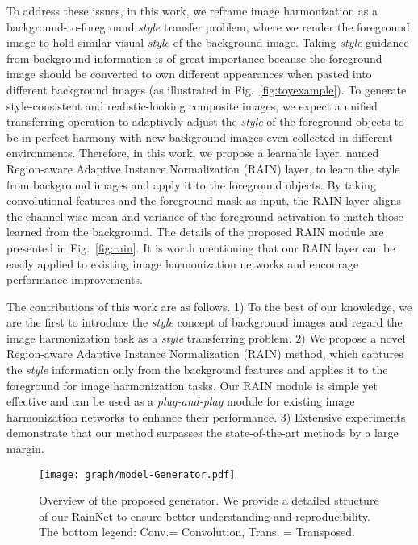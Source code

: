 \documentclass[final]{cvpr}
\begin{document}
To address these issues, in this work, we reframe image harmonization as a background-to-foreground \emph{style} transfer problem, where we render the foreground image to hold similar visual \emph{style} of the background image. Taking \emph{style} guidance from background information is of great importance because the foreground image should be converted to own different appearances when pasted into different background images (as illustrated in Fig.~\ref{fig:toyexample}). To generate style-consistent and realistic-looking composite images, we expect a unified transferring operation to adaptively adjust the \emph{style} of the foreground objects to be in perfect harmony with new background images even collected in different environments. Therefore, in this work, we propose a learnable layer, named Region-aware Adaptive Instance Normalization (RAIN) layer, to learn the style from background images and apply it to the foreground objects. By taking convolutional features and the foreground mask as input, the RAIN layer aligns the channel-wise mean and variance of the foreground activation to match those learned from the background. The details of the proposed RAIN module are presented in Fig.~\ref{fig:rain}. It is worth mentioning that our RAIN layer can be easily applied to existing image harmonization networks and encourage performance improvements. 

The contributions of this work are as follows. 
1) To the best of our knowledge, we are the first to introduce the \emph{style} concept of background images and regard the image harmonization task as a \emph{style} transferring problem. 
2) We propose a novel Region-aware Adaptive Instance Normalization (RAIN) method, which captures the \emph{style} information only from the background features and applies it to the foreground for image harmonization tasks. Our RAIN module is simple yet effective and can be used as a \emph{plug-and-play} module for existing image harmonization networks to enhance their performance. 
3) Extensive experiments demonstrate that our method surpasses the state-of-the-art methods by a large margin. 


\begin{figure*}[t]
\begin{center}
\texttt{[image: graph/model-Generator.pdf]}
\end{center}
   \caption{Overview of the proposed generator. We provide a detailed structure of our RainNet to ensure better understanding and reproducibility. The bottom legend: Conv.= Convolution, Trans. = Transposed. }
\label{fig:model_attentioned}
\end{figure*}
\end{document}
